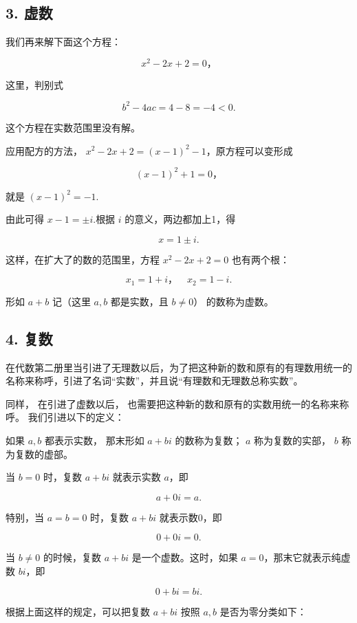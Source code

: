 \subsection{3. 虚数}

我们再来解下面这个方程：

\[
x ^ {2} - 2 x + 2 = 0\text{，}
\]

这里，判别式

\[
b ^ {2} - 4 a c = 4 - 8 = - 4 < 0.
\]

这个方程在实数范围里没有解。

应用配方的方法， \(x^{2}-2x+2=(x-1)^{2}-1\)，原方程可以变形成

\[
(x - 1) ^ {2} + 1 = 0\text{，}
\]

就是 \((x - 1)^{2} = -1.\)

由此可得 \(x - 1 = \pm i.\)根据 \(i\) 的意义，两边都加上1，得

\[
x = 1 \pm i.
\]

这样，在扩大了的数的范围里，方程 \(x^{2} - 2x + 2 = 0\) 也有两个根：

\[
x _ {1} = 1 + i\text{，} \quad x _ {2} = 1 - i.
\]

形如 \(a + b\) 记（这里 \(a, b\) 都是实数，且 \(b \neq 0\)）
的数称为虚数。

\subsection{4. 复数}

在代数第二册里当引进了无理数以后，为了把这种新的数和原有的有理数用统一的名称来称呼，引进了名词``实数''，并且说``有理数和无理数总称实数''。

同样， 在引进了虚数以后，
也需要把这种新的数和原有的实数用统一的名称来称呼。 我们引进以下的定义：

如果 \(a, b\) 都表示实数， 那末形如 \(a + bi\) 的数称为复数； \(a\)
称为复数的实部， \(b\) 称为复数的虚部。

当 \(b = 0\) 时，复数 \(a + bi\) 就表示实数 \(a\)，即

\[
a + 0 i = a.
\]

特别，当 \(a = b = 0\) 时，复数 \(a + bi\) 就表示数0，即

\[
0 + 0 i = 0.
\]

当 \(b \neq 0\) 的时候，复数 \(a + bi\) 是一个虚数。这时，如果
\(a = 0\)，那末它就表示纯虚数 \(bi\)，即

\[
0 + b i = b i.
\]

根据上面这样的规定，可以把复数 \(a + bi\) 按照 \(a, b\)
是否为零分类如下：

